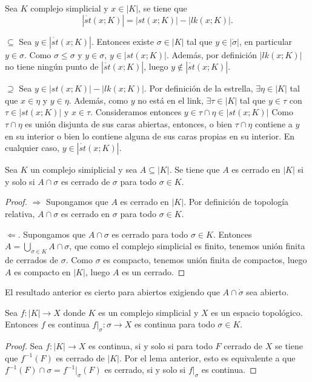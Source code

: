 \documentclass[HS.tex]{subfiles}
\begin{document}
\begin{prop}
Sea $K$ complejo simplicial y $x\in|K|$, se tiene que
\[
|\mathring{st}(x;K)|=|st(x;K)|-|lk(x;K)|.
\]
\end{prop}
\begin{dem}
$\boxed{\subseteq}$ Sea $y\in |\mathring{st}(x;K)|$. Entonces existe $\sigma\in |K|$ tal que $y\in|\mathring{\sigma}|$, en particular $y\in\sigma$. Como $\sigma\leq\sigma$ y $y\in\sigma$, $y\in |st(x;K)|$. Además, por definición $|lk(x;K)|$ no tiene ningún punto de $|\mathring{st}(x;K)|$, luego $y\notin|\mathring{st}(x;K)|$.

$\boxed{\supseteq}$ Sea $y\in |st(x;K)|-|lk(x;K)|$. Por definición de la estrella, $\exists\eta\in |K|$ tal que $x\in\eta$ y $y\in\eta$. Además, como $y$ no está en el link, $\exists \tau\in |K|$ tal que $y\in\tau$ con $\tau\in |st(x;K)|$ y $x\in\tau$. Consideramos entonces $y\in\tau\cap\eta\in |st(x;K)|$ Como $\tau\cap\eta$ es unión disjunta de sus caras abiertas, entonces, o bien $\tau\cap\eta$ contiene a $y$ en su interior o bien lo contiene alguna de sus caras propias en su interior. En cualquier caso, $y\in |\mathring{st}(x;K)|$.  \QED
\end{dem}

\begin{lemma}
Sea $K$ un complejo simiplicial y sea $A\subseteq|K|$. Se tiene que $A$ es cerrado en $|K|$ si y solo si $A\cap\sigma$ es cerrado de $\sigma$ para todo $\sigma\in K$. 
\end{lemma}
\begin{proof}
$\boxed{\Rightarrow}$ Supongamos que $A$ es cerrado en $|K|$. Por definición de topología relativa, $A\cap\sigma$ es cerrado en $\sigma$ para todo $\sigma\in K$.

$\boxed{\Leftarrow}$. Supongamos que $A\cap\sigma$ es cerrado para todo $\sigma\in K$. Entonces $A=\bigcup_{\sigma\in K} A\cap\sigma$, que como el complejo simplicial es finito, tenemos unión finita de cerrados de $\sigma$. Como $\sigma$ es compacto, tenemos unión finita de compactos, luego $A$ es compacto en $|K|$, luego $A$ es un cerrado.
\end{proof}

El resultado anterior es cierto para abiertos exigiendo que $A\cap\mathring{\sigma}$ sea abierto.

\begin{lemma}
Sea $f:|K|\to X$ donde $K$ es un complejo simplicial y $X$ es un espacio topológico. Entonces $f$ es continua $f|_{\sigma}:\sigma\to X$ es continua para todo $\sigma\in K$.
\end{lemma}
\begin{proof}
 Sea $f:|K|\to X$ es continua, si y solo si para todo $F$ cerrado de $X$ se tiene que $f^{-1}(F)$ es cerrado de $|K|$. Por el lema anterior, esto es equivalente a que $f^{-1}(F)\cap\sigma=f^{-1}|_{\sigma}(F)$ es cerrado, si y solo si $f|_{\sigma}$ es continua.
\end{proof}
\end{document}
